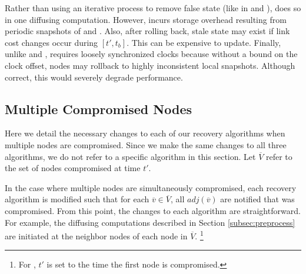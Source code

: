 Rather than using an iterative process to remove false state (like in \second and \purges), \cpr does so in one diffusing computation.
However, \cpr incurs storage overhead resulting from periodic snapshots of \minv and \dmatrixs.  Also, after rolling back, stale state may exist if link cost changes occur during $[t',t_b]$.
This can be expensive to update.
Finally, unlike \purge and \seconds, \cpr requires loosely synchronized clocks because without a bound on the clock offset, nodes may rollback to highly inconsistent local snapshots.
Although correct, this would severely degrade \cpr performance.

\subsection{Multiple Compromised Nodes}
\label{subsec:mult}

Here we detail the necessary changes to each of our recovery algorithms when multiple nodes are compromised. Since we make the same changes to all three algorithms, we do not refer 
to a specific algorithm in this section. Let $\overline{V}$ refer to the set of nodes compromised at time $t'$. 

In the case where multiple nodes are simultaneously compromised, each recovery algorithm is modified such that for each $\overline{v} \in \overline{V}$, all $adj(\overline{v})$
are notified that \bad was compromised. 
From this point, the changes to each algorithm are straightforward.  For example,
the diffusing computations described in Section  \ref{subsec:preprocess} are initiated at the neighbor nodes of each node in $\overline{V}$.
{\footnote {\small For \cprs, $t'$ is set to the time the first node is compromised.}}

